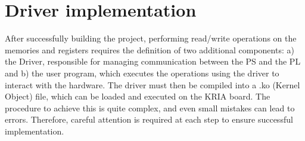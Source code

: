 \section{Driver implementation}
After successfully building the project, performing read/write operations on the memories and registers requires the definition of two additional components: a) the Driver, responsible for managing communication between the PS and the PL and b) the user program, which executes the operations using the driver to interact with the hardware. The driver must then be compiled into a .ko (Kernel Object) file, which can be loaded and executed on the KRIA board. The procedure to achieve this is quite complex, and even small mistakes can lead to errors. Therefore, careful attention is required at each step to ensure successful implementation.



